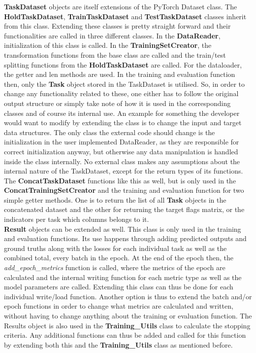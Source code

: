 \textbf{TaskDataset} objects are itself extensions of the PyTorch Dataset class. The \textbf{HoldTaskDataset}, \textbf{TrainTaskDataset} and \textbf{TestTaskDataset} classes inherit from this class. Extending these classes is pretty straight forward and their functionalities are called in three different classes. In the \textbf{DataReader}, initialization of this class is called. In the \textbf{TrainingSetCreator}, the transformation functions from the base class are called and the train/test splitting functions from the \textbf{HoldTaskDataset} are called. For the dataloader, the getter and len methods are used. In the training and evaluation function then, only the \textbf{Task} object stored in the TaskDataset is utilised. So, in order to change any functionality related to these, one either has to follow the original output structure or simply take note of how it is used in the corresponding classes and of course its internal use. An example for something the developer would want to modify by extending the class is to change the input and target data structures. The only class the external code should change is the initialization in the user implemented DataReader, as they are responsible for correct initialization anyway, but otherwise any data manipulation is handled inside the class internally. No external class makes any assumptions about the internal nature of the TaskDataset, except for the return types of its functions.\\

The \textbf{ConcatTaskDataset} functions like this as well, but is only used in the \textbf{ConcatTrainingSetCreator} and the training and evaluation function for two simple getter methods. One is to return the list of all \textbf{Task} objects in the concatenated dataset and the other for returning the target flags matrix, or the indicators per task which columns belongs to it. \\

\textbf{Result} objects can be extended as well. This class is only used in the training and evaluation functions. Its use happens through adding predicted outputs and ground truths along with the losses for each individual task as well as the combined total, every batch in the epoch. At the end of the epoch then, the \textit{add\_epoch\_metrics} function is called, where the metrics of the epoch are calculated and the internal writing function for each metric type as well as the model parameters are called. Extending this class can thus be done for each individual write/load function. Another option is thus to extend the batch and/or epoch functions in order to change what metrics are calculated and written, without having to change anything about the training or evaluation function. The Results object is also used in the \textbf{Training\_Utils} class to calculate the stopping criteria. Any additional functions can thus be added and called for this function by extending both this and the \textbf{Training\_Utils} class as mentioned before.\\

